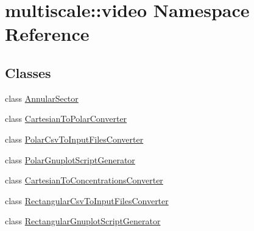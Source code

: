 \hypertarget{namespacemultiscale_1_1video}{\section{multiscale\-:\-:video Namespace Reference}
\label{namespacemultiscale_1_1video}
}
\subsection*{Classes}
\begin{DoxyCompactItemize}
\item 
class \hyperlink{classmultiscale_1_1video_1_1AnnularSector}{Annular\-Sector}
\item 
class \hyperlink{classmultiscale_1_1video_1_1CartesianToPolarConverter}{Cartesian\-To\-Polar\-Converter}
\item 
class \hyperlink{classmultiscale_1_1video_1_1PolarCsvToInputFilesConverter}{Polar\-Csv\-To\-Input\-Files\-Converter}
\item 
class \hyperlink{classmultiscale_1_1video_1_1PolarGnuplotScriptGenerator}{Polar\-Gnuplot\-Script\-Generator}
\item 
class \hyperlink{classmultiscale_1_1video_1_1CartesianToConcentrationsConverter}{Cartesian\-To\-Concentrations\-Converter}
\item 
class \hyperlink{classmultiscale_1_1video_1_1RectangularCsvToInputFilesConverter}{Rectangular\-Csv\-To\-Input\-Files\-Converter}
\item 
class \hyperlink{classmultiscale_1_1video_1_1RectangularGnuplotScriptGenerator}{Rectangular\-Gnuplot\-Script\-Generator}
\end{DoxyCompactItemize}
